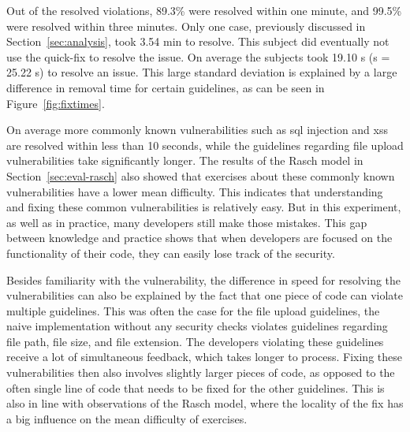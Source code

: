 Out of the resolved violations, 89.3\% were resolved within one minute, and 99.5\% were resolved within three minutes.
Only one case, previously discussed in Section~\ref{sec:analysis}, took 3.54 min to resolve.
This subject did eventually not use the quick-fix to resolve the issue.
On average the subjects took 19.10 s (s = 25.22 s) to resolve an issue.
This large standard deviation is explained by a large difference in removal time for certain guidelines, as can be seen in Figure~\ref{fig:fixtimes}.

On average more commonly known vulnerabilities such as \gls{sql} injection and \gls{xss} are resolved within less than 10 seconds, while the guidelines regarding file upload vulnerabilities take significantly longer.
The results of the Rasch model in Section~\ref{sec:eval-rasch} also showed that exercises about these commonly known vulnerabilities have a lower mean difficulty.
This indicates that understanding and fixing these common vulnerabilities is relatively easy.
But in this experiment, as well as in practice, many developers still make those mistakes.
This  gap between knowledge and practice shows that when developers are focused on the functionality of their code, they can easily lose track of the security.

Besides familiarity with the vulnerability, the difference in speed for resolving the vulnerabilities can also be explained by the fact that one piece of code can violate multiple guidelines.
This was often the case for the file upload guidelines, the naive implementation without any security checks violates guidelines regarding file path, file size, and file extension.
The developers violating these guidelines receive a lot of simultaneous feedback, which takes longer to process.
Fixing these vulnerabilities then also involves slightly larger pieces of code, as opposed to the often single line of code that needs to be fixed for the other guidelines.
This is also in line with observations of the Rasch model, where the locality of the fix has a big influence on the mean difficulty of exercises.

